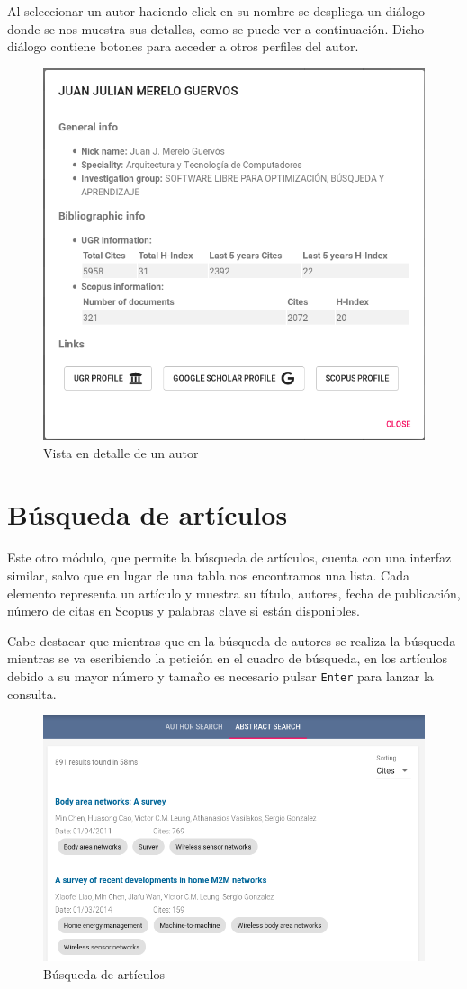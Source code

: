Al seleccionar un autor haciendo click en su nombre se despliega un diálogo donde se nos muestra sus detalles, como se puede ver a continuación. Dicho diálogo contiene botones para acceder a otros perfiles del autor.
\begin{figure}[h]
	\centering
	\includegraphics[width=0.7\linewidth]{imagenes/UIAuthorDetail}
	\caption{Vista en detalle de un autor}
	  \vspace{-30pt}
\end{figure}

\section{Búsqueda de artículos}
Este otro módulo, que permite la búsqueda de artículos, cuenta con una interfaz similar, salvo que en lugar de una tabla nos encontramos una lista. Cada elemento representa un artículo y muestra su título, autores, fecha de publicación, número de citas en Scopus y palabras clave si están disponibles.

Cabe destacar que mientras que en la búsqueda de autores se realiza la búsqueda mientras se va escribiendo la petición en el cuadro de búsqueda, en los artículos debido a su mayor número y tamaño es necesario pulsar \texttt{Enter} para lanzar la consulta.
\begin{figure}[h]
	
	\centering
	\includegraphics[width=\linewidth]{imagenes/UIAbstract}
	\caption{Búsqueda de artículos}
\end{figure}

